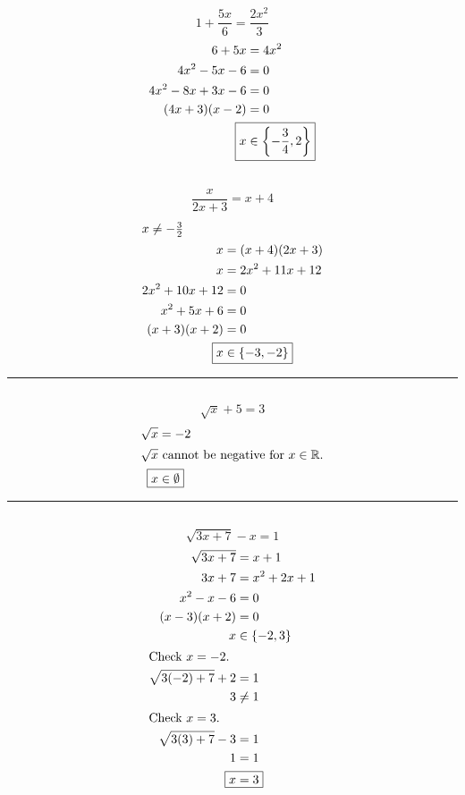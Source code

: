 	\subsection{}
		\[1 + \frac{5x}{6} = \frac{2x^2}{3}\]
		\begin{align*}
			6 + 5x &= 4x^2 \\
			4x^2 - 5x - 6 &= 0 \\
			4x^2 - 8x + 3x - 6 &= 0 \\
			(4x + 3)(x - 2) &= 0 \\
			\Aboxed{x &\in \left\{-\frac{3}{4}, 2\right\}}
		\end{align*}

	\subsection{}
		\[\frac{x}{2x + 3} = x + 4\]
		\begin{align*}
			\intertext{$x \neq -\frac{3}{2}$}
			x &= (x + 4)(2x + 3) \\
			x &= 2x^2 + 11x + 12 \\
			2x^2 + 10x + 12 &= 0 \\
			x^2 + 5x + 6 &= 0 \\
			(x + 3)(x + 2) &= 0 \\
			\Aboxed{x &\in \{-3, -2\}}
		\end{align*}
		\hrule{}

	\subsection{}
		\[\sqrt{x} + 5 = 3\]
		\begin{align*}
			\sqrt{x} &= -2 \\
			\intertext{$\sqrt{x}$ cannot be negative for $x \in \mathbb{R}$.}
			\Aboxed{x &\in \emptyset}
		\end{align*}
		\hrule{}

	\subsection{}
		\[\sqrt{3x + 7} - x = 1\]
		\begin{align*}
			\sqrt{3x + 7} &= x + 1 \\
			3x + 7 &= x^2 + 2x + 1 \\
			x^2 - x - 6 &= 0 \\
			(x - 3)(x + 2) &= 0 \\
			x &\in \{-2, 3\} \\
			\intertext{Check $x = -2$.}
			\sqrt{3(-2) + 7} + 2 &= 1 \\
			3 &\neq 1 \\
			\intertext{Check $x = 3$.}
			\sqrt{3(3) + 7} - 3 &= 1 \\
			1 &= 1 \\
			\Aboxed{x &= 3}
		\end{align*}
		\pagebreak{}

